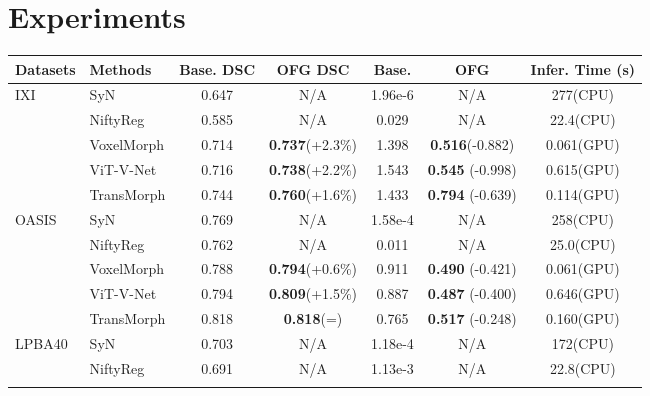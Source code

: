 \documentclass[10pt,twocolumn,letterpaper]{article}
\begin{document}
 \section{Experiments}\label{sec:exp}

\begin{table*}[t]
    \begin{center}
    {\small{
    \begin{tabular}{llccccc}
\toprule
    Datasets & Methods & Base. DSC  & \textbf{OFG DSC}  & Base.   & \textbf{OFG }  & Infer. Time (s)\\
    \midrule
    \multirow{5}{*}{IXI \cite{ixi}} 
    & SyN \cite{AVANTS200826} & 0.647 & N/A & 1.96e-6 & N/A & 277(CPU) \\
    & NiftyReg \cite{niftyreg} & 0.585 & N/A & 0.029 & N/A & 22.4(CPU) \\
    \noalign{\smallskip}
    \cline{2-7}
    \noalign{\smallskip}
    & VoxelMorph \cite{Balakrishnan_2019} & 0.714 & \textbf{0.737}(+2.3\%) & 1.398 & \textbf{0.516}(-0.882) & 0.061(GPU) \\
    & ViT-V-Net \cite{chen2021vitvnet} & 0.716 & \textbf{0.738}(+2.2\%) & 1.543 & \textbf{0.545} (-0.998) & 0.615(GPU) \\
    & TransMorph \cite{Chen_2022} & 0.744 & \textbf{0.760}(+1.6\%) & 1.433 & \textbf{0.794} (-0.639) & 0.114(GPU) \\
    \midrule
    \multirow{5}{*}{OASIS \cite{10.1162/jocn.2007.19.9.1498}} 
    & SyN \cite{AVANTS200826} & 0.769 & N/A & 1.58e-4 & N/A & 258(CPU) \\
    & NiftyReg \cite{niftyreg} & 0.762 & N/A & 0.011 & N/A & 25.0(CPU) \\
    \noalign{\smallskip}
    \cline{2-7}
    \noalign{\smallskip}
    & VoxelMorph \cite{Balakrishnan_2019} & 0.788 & \textbf{0.794}(+0.6\%) & 0.911 & \textbf{0.490} (-0.421) & 0.061(GPU) \\
    & ViT-V-Net \cite{chen2021vitvnet} & 0.794 & \textbf{0.809}(+1.5\%) & 0.887 & \textbf{0.487} (-0.400) & 0.646(GPU) \\
    & TransMorph \cite{Chen_2022} & 0.818 & \textbf{0.818}(=) & 0.765 & \textbf{0.517} (-0.248) & 0.160(GPU) \\
    \midrule
    \multirow{5}{*}{LPBA40 \cite{lpba}} 
    & SyN \cite{AVANTS200826} & 0.703 & N/A & 1.18e-4 & N/A & 172(CPU) \\
    & NiftyReg \cite{niftyreg} & 0.691 & N/A & 1.13e-3 & N/A & 22.8(CPU) \\
    \noalign{\smallskip}
    \cline{2-7}
    \noalign{\smallskip}

\end{tabular}}}
\end{center}
\end{table*}
\end{document}
